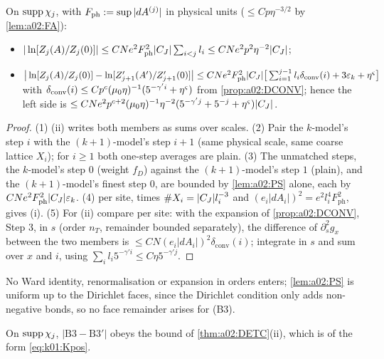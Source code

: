 \begin{theorem}\label{thm:a02:DETC}
On $\operatorname{supp}\chi_j$, with $F_{\mathrm{ph}}:=\sup|dA^{(j)}|$ in physical units ($\le Cp\eta^{-3/2}$ by \cref{lem:a02:FA}):
\begin{itemize}[nosep]
\item[(i)] $|\ln[Z_j(A)/Z_j(0)]|\le CNe^2F_{\mathrm{ph}}^2|C_J|\sum_{i<j}l_i\le CNe^2p^2\eta^{-2}|C_J|$;
\item[(ii)] $\big|\ln[Z_j(A)/Z_j(0)]-\ln[Z'_{j+1}(A')/Z'_{j+1}(0)]\big|\le CNe^2F_{\mathrm{ph}}^2|C_J|\big[\sum_{i=1}^{j-1}l_i\delta_{\mathrm{conv}}(i)+3\varepsilon_k+\eta^\varsigma\big]$ with $\delta_{\mathrm{conv}}(i)\le Cp^c(\mu_0\eta)^{-1}(5^{-\gamma'i}+\eta^\varsigma)$ from \cref{prop:a02:DCONV}; hence the left side is $\le CNe^2p^{c+2}(\mu_0\eta)^{-1}\eta^{-2}(5^{-\gamma'j}+5^{-j}+\eta^\varsigma)|C_J|$.
\end{itemize}
\end{theorem}
\begin{proof}
(1) (ii) writes both members as sums over scales. (2) Pair the $k$-model's step $i$ with the $(k+1)$-model's step $i+1$ (same physical scale, same coarse lattice $X_i$); for $i\ge1$ both one-step averages are plain. (3) The unmatched steps, the $k$-model's step $0$ (weight $f_D$) against the $(k+1)$-model's step $1$ (plain), and the $(k+1)$-model's finest step $0$, are bounded by \cref{lem:a02:PS} alone, each by $CNe^2F_{\mathrm{ph}}^2|C_J|\varepsilon_k$. (4)  per site, times $\#X_i=|C_J|l_i^{-3}$ and $(e_i|dA_i|)^2=e^2l_i^4F_{\mathrm{ph}}^2$, gives (i). (5) For (ii) compare per site: with the expansion of \cref{prop:a02:DCONV}, Step 3, in $s$ (order $n_T$, remainder bounded separately), the difference of $\partial_s^2g_x$ between the two members is $\le CN(e_i|dA_i|)^2\delta_{\mathrm{conv}}(i)$; integrate in $s$ and sum over $x$ and $i$, using $\sum_il_i5^{-\gamma'i}\le C\eta5^{-\gamma'j}$.
\end{proof}
No Ward identity, renormalisation or expansion in orders enters; \cref{lem:a02:PS} is uniform up to the Dirichlet faces, since the Dirichlet condition only adds non-negative bonds, so no face remainder arises for (B3).

\begin{corollary}[(B3)]\label{cor:a02:B3}
On $\operatorname{supp}\chi_j$, $|\mathrm{B3}-\mathrm{B3}'|$ obeys the bound of \cref{thm:a02:DETC}(ii), which is of the form \eqref{eq:k01:Kpos}.
\end{corollary}

